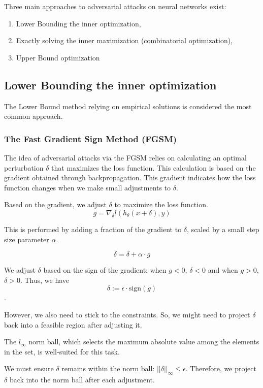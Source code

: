 Three main approaches to adversarial attacks on neural networks exist: 
\begin{enumerate}
    \item Lower Bounding the inner optimization, 
    \item Exactly solving the inner maximization (combinatorial optimization), 
    \item Upper Bound optimization
\end{enumerate}


\subsection{Lower Bounding the inner optimization}

The Lower Bound method relying on empirical solutions is considered the most common approach.

\subsubsection{The Fast Gradient Sign Method (FGSM)}

The idea of adversarial attacks via the FGSM relies on calculating an optimal perturbation 
$\delta$ that maximizes the loss function. This calculation is based on the gradient obtained through backpropagation. 
This gradient indicates how the loss function changes when we make small adjustments to $\delta$.

Based on the gradient, we adjust $\delta$ to maximize the loss function. 
\[g = \nabla_\delta l(h_\theta(x + \delta), y)\]

This is performed by adding a fraction of 
the gradient to $\delta$, scaled by a small step size parameter $\alpha$.

\[\delta = \delta +  \alpha \cdot g\]

We adjust $\delta$ based on the sign of the gradient: when $g<0$, $\delta < 0$ and when $g>0$, $\delta > 0$. 
Thus, we have \[\delta := \epsilon \cdot \text{sign}(g)\].

However, we also need to stick to the constraints. So, we might need to project $\delta$ back into a feasible region after adjusting it.

The  $l_{\infty}$ norm ball, which selects the maximum absolute value among the elements in the set, is well-suited for this task.

We must ensure $\delta$ remains within the norm ball: $||\delta||_\infty \leq \epsilon$. 
Therefore, we project $\delta$ back into the norm ball after each adjustment.


